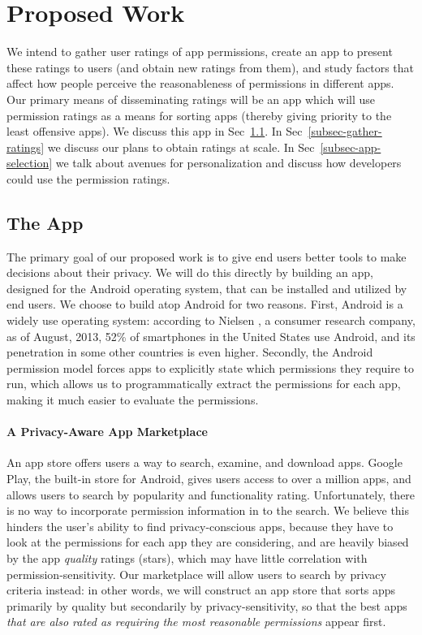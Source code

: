 \documentclass[11pt]{article}
\begin{document}
\section{Proposed Work}

We intend to gather user ratings of app permissions, create 
an app to present these ratings
to users (and obtain new ratings from them), and study factors that
affect how people perceive the reasonableness of permissions in
different apps. Our primary means of disseminating ratings will be
an app which will use permission ratings as a means for sorting
apps (thereby giving priority to the least offensive apps). 
We discuss this app in Sec~\ref{subsec-the-apps}. 
In Sec~\ref{subsec-gather-ratings} 
we discuss our plans to obtain ratings at scale. In
Sec~\ref{subsec-app-selection} we talk about avenues for personalization 
and discuss how developers could use the permission ratings.

\subsection{The App}
\label{subsec-the-apps}

The primary goal of our proposed work is to give end users better tools to make decisions
about their privacy. We will do this directly by building an app, designed for the Android 
operating system, that can be installed 
and utilized by end users. We choose to build atop Android for two reasons.
First, Android is a widely use operating system: according to Nielsen 
\cite{android-market-share}, a consumer research 
company, as of August, 2013, 52\% of smartphones in the United
States use Android, and its penetration in some other countries is
even higher.
Secondly, the Android permission model forces apps to explicitly state which permissions
they require to run, which allows us to programmatically extract the permissions for each 
app, making it much easier to evaluate the permissions. 

\paragraph{A Privacy-Aware App Marketplace}
\label{subsubsec-privacy-store}

An app store offers users a way to search, examine, and download
apps.  Google Play, the built-in store for Android, gives
users access to over a million apps, and allows users to search by
popularity and functionality rating. Unfortunately, there is no way to incorporate
permission information in to the search. We believe this hinders the
user's ability to find privacy-conscious apps, because they have to
look at the permissions for each app they are considering, and are
heavily biased by the app \emph{quality} ratings (stars), which may
have little correlation with permission-sensitivity. Our marketplace
will allow users to search by privacy criteria instead: in other
words, we will construct an app store that sorts apps primarily by
quality but secondarily by privacy-sensitivity, so that the best apps
\emph{that are also rated as requiring the most reasonable
  permissions} appear first.
\end{document}
